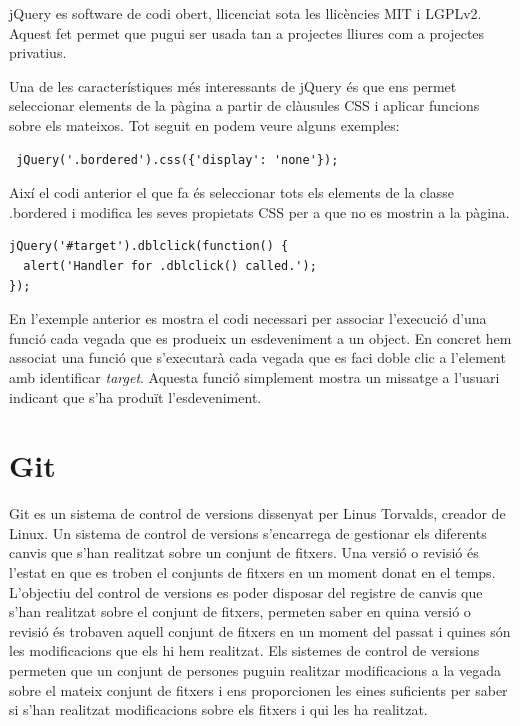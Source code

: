 jQuery es software de codi obert, llicenciat sota les llicències MIT i LGPLv2. Aquest fet permet que pugui ser usada tan a projectes lliures com a projectes privatius. 

Una de les característiques més interessants de jQuery és que ens permet seleccionar elements de la pàgina a partir de clàusules CSS i aplicar funcions sobre els mateixos. Tot seguit en podem veure alguns exemples: 

\begin{lstlisting}
 jQuery('.bordered').css({'display': 'none'});
\end{lstlisting}

Així el codi anterior el que fa és seleccionar tots els elements de la classe .bordered i modifica les seves propietats CSS per a que no es mostrin a la pàgina. 

\begin{lstlisting}
jQuery('#target').dblclick(function() {
  alert('Handler for .dblclick() called.');
});
\end{lstlisting}

En l'exemple anterior es mostra el codi necessari per associar l'execució d'una funció cada vegada que es produeix un esdeveniment a un object. En concret hem associat una funció que s'executarà cada vegada que es faci doble clic a l'element amb identificar \emph{target}. Aquesta funció simplement mostra un missatge a l'usuari indicant que s'ha produït l'esdeveniment. 

\section{Git}

Git es un sistema de control de versions dissenyat per Linus Torvalds, creador de Linux. Un sistema de control de versions s'encarrega de gestionar els diferents canvis que s'han realitzat sobre un conjunt de fitxers. Una versió o revisió és l'estat en que es troben el conjunts de fitxers en un moment donat en el temps. L'objectiu del control de versions es poder disposar del registre de canvis que s'han realitzat sobre el conjunt de fitxers, permeten saber en quina versió o revisió és trobaven aquell conjunt de fitxers en un moment del passat i quines són les modificacions que els hi hem realitzat. Els sistemes de control de versions permeten que un conjunt de persones puguin realitzar modificacions a la vegada sobre el mateix conjunt de fitxers i ens proporcionen les eines suficients per saber si s'han realitzat modificacions sobre els fitxers i qui les ha realitzat. 

